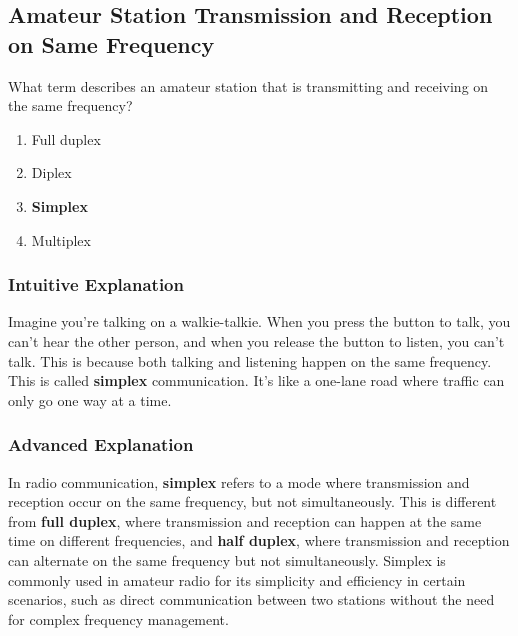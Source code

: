 \subsection{Amateur Station Transmission and Reception on Same Frequency}
\label{T2A11}

\begin{tcolorbox}[colback=gray!10!white,colframe=black!75!black,title=T2A11]
What term describes an amateur station that is transmitting and receiving on the same frequency?
\begin{enumerate}[noitemsep]
    \item Full duplex
    \item Diplex
    \item \textbf{Simplex}
    \item Multiplex
\end{enumerate}
\end{tcolorbox}

\subsubsection*{Intuitive Explanation}
Imagine you're talking on a walkie-talkie. When you press the button to talk, you can't hear the other person, and when you release the button to listen, you can't talk. This is because both talking and listening happen on the same frequency. This is called \textbf{simplex} communication. It's like a one-lane road where traffic can only go one way at a time.

\subsubsection*{Advanced Explanation}
In radio communication, \textbf{simplex} refers to a mode where transmission and reception occur on the same frequency, but not simultaneously. This is different from \textbf{full duplex}, where transmission and reception can happen at the same time on different frequencies, and \textbf{half duplex}, where transmission and reception can alternate on the same frequency but not simultaneously. Simplex is commonly used in amateur radio for its simplicity and efficiency in certain scenarios, such as direct communication between two stations without the need for complex frequency management.